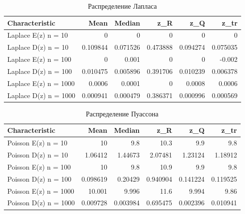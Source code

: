 \documentclass[../body.tex]{subfiles}
\begin{document}
	\begin{table}[H]
	\centering
		\begin{tabular}[t]{lrrrrr}
			\hline
			Characteristic    &      Mean &    Median &       z\_R &       z\_Q &      z\_tr \\
			\hline
			Laplace E(z) n = 10   &  0 &  0 &  0 &  0 &  0 \\
			Laplace D(z) n = 10   &  0.109844 &  0.071526 &  0.473888 &  0.094274 &  0.075035 \\
			Laplace E(z) n = 100  &  0 &  0.001 &  0 &  0 & -0.002 \\
			Laplace D(z) n = 100  &  0.010475 &  0.005896 &  0.391706 &  0.010239 &  0.006378 \\
			Laplace E(z) n = 1000 &  0.0006 &  0.0001 &  0 &  0.0008 &  0.0006 \\
			Laplace D(z) n = 1000 &  0.000941 &  0.000479 &  0.386371 &  0.000996 &  0.000569 \\
			\hline
		\end{tabular}
		\caption{Распределение Лапласа}
		\label{tab:laplece}
	\end{table}

\begin{table}[H]
	\centering
	\begin{tabular}[t]{lrrrrr}
		\hline
		Characteristic    &      Mean &   Median &       z\_R &      z\_Q &     z\_tr \\
		\hline
		Poisson E(z) n = 10   & 10   & 9.8   & 10.3   & 9.9  & 9.8     \\
		Poisson D(z) n = 10   &  1.06412  & 1.44673  &  2.07481  & 1.23124  & 1.18912  \\
		Poisson E(z) n = 100  & 10   & 9.8   & 10.9    & 9.9  & 9.8   \\
		Poisson D(z) n = 100  &  0.098619 & 0.20429  &  0.940904 & 0.141224 & 0.119525 \\
		Poisson E(z) n = 1000 & 10.001   & 9.996    & 11.6    & 9.994  & 9.86  \\
		Poisson D(z) n = 1000 &  0.009728 & 0.003984 &  0.695475 & 0.002396 & 0.010941 \\
		\hline
	\end{tabular}
	
	\caption{Распределение Пуассона}
	\label{tab:poisson}
\end{table}
\end{document}
